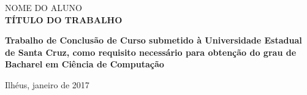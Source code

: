 
\begin{center}

    {\large NOME DO ALUNO\\}
    \vspace{8cm}
    {\Large \textsc\textbf{{TÍTULO DO TRABALHO} }\\}
    \vspace{1cm}
    \hspace{.45\linewidth}
    \begin{minipage}{.50\linewidth}

            \textbf{Trabalho de Conclusão de Curso submetido à Universidade Estadual de Santa Cruz,  como requisito 
            necessário para obtenção do grau de Bacharel em Ciência de Computação }

           
    
    \end{minipage}

    \vspace{2cm}
    \vfill
    {\large Ilhéus, janeiro de 2017}
\end{center}

